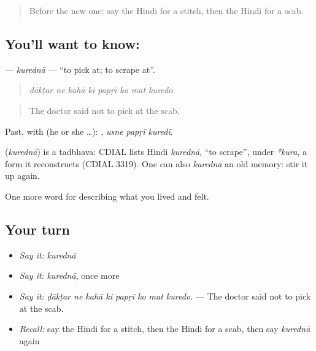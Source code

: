 \label{lesson:HI-C490-kuredna}



\begin{quote}
Before the new one: say the Hindi for a stitch, then the Hindi for a scab.
\end{quote}

\subsection*{You'll want to know: }
\textbf{} — \emph{kurednā} — \textquotedblleft{}to pick at; to scrape at\textquotedblright{}.

\begin{quote}
       
\end{quote}

\begin{quote}
\emph{ḍākṭar ne kahā ki papṛī ko mat kuredo.}
\end{quote}

\begin{quote}
The doctor said not to pick at the scab.
\end{quote}

Past, with  (he or she …):   , \emph{usne papṛī kuredī}.

\begin{cousinweb}
\textbf{} (\emph{kurednā}) is a tadbhava: CDIAL lists Hindi \emph{kurednā}, \textquotedblleft{}to scrape\textquotedblright{}, under \emph{*kura}, a form it reconstructs (CDIAL 3319). One can also \emph{kurednā} an old memory: stir it up again.
\end{cousinweb}

\begin{grammarlens}[title={What you've built}]
One more word for describing what you lived and felt.
\end{grammarlens}

\subsection*{Your turn}
\begin{itemize}
\raggedright
  \item \emph{Say it:} \emph{kurednā}
  \item \emph{Say it:} \emph{kurednā}, once more
  \item \emph{Say it:} \emph{ḍākṭar ne kahā ki papṛī ko mat kuredo.} — The doctor said not to pick at the scab.
  \item \emph{Recall:} say the Hindi for a stitch, then the Hindi for a scab, then say \emph{kurednā} again
\end{itemize}

